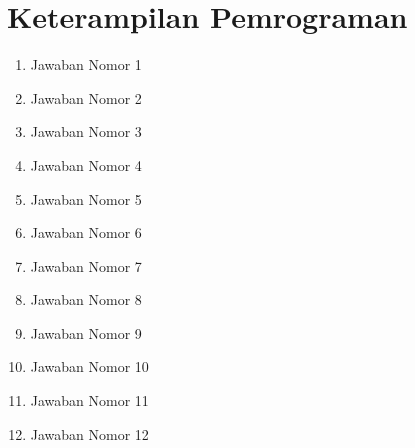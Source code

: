 \section{Keterampilan Pemrograman}
\begin{enumerate}
    \item Jawaban Nomor 1
        
    \item Jawaban Nomor 2
        
    \item Jawaban Nomor 3
        
    \newpage
    
    \item Jawaban Nomor 4
        
    \item Jawaban Nomor 5
        
    \item Jawaban Nomor 6
        
    \item Jawaban Nomor 7
        
    \newpage
    
    \item Jawaban Nomor 8
        
    \item Jawaban Nomor 9
        
    \item Jawaban Nomor 10
        
    \newpage
    
    \item Jawaban Nomor 11
        
    \item Jawaban Nomor 12
        
\end{enumerate}

